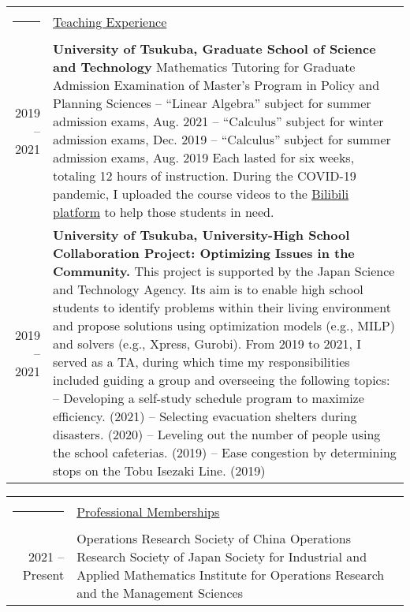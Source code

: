 \documentclass[a4paper,11pt]{article}
\newcommand{\headingfont}{\LARGE \MakeUppercase }
\newenvironment{SectionTable}[1]{
	\renewcommand*{\arraystretch}{1.0}
	\setlength{\tabcolsep}{10pt}
	\begin{longtable}{Rp{5.2in}} 
		\rule{2.3cm}{4pt} 
		& \underline{#1} \\ %
	}
	{
	\end{longtable}\vspace{-.3cm}
}
\begin{document}
\begin{SectionTable}{\headingfont Teaching Experience}
	2019 -- 2021 &
	\textbf{University of Tsukuba, Graduate School of Science and Technology} \newline
	Mathematics Tutoring for Graduate Admission Examination of Master's Program in Policy and Planning Sciences \newline
	-- ``Linear Algebra'' subject for summer admission exams, Aug. 2021  \newline
	-- ``Calculus'' subject for winter admission exams, Dec. 2019 \newline
	-- ``Calculus'' subject for summer admission exams, Aug. 2019 \newline
	Each lasted for six weeks, totaling 12 hours of instruction. During the COVID-19 pandemic, I uploaded the course videos to the \href{https://space.bilibili.com/16115578}{Bilibili platform} to help those students in need. \\
	 
	 2019 -- 2021 &
	 \textbf{University of Tsukuba, University-High School Collaboration Project: Optimizing Issues in the Community.} \newline	
	This project is supported by the Japan Science and Technology Agency. Its aim is to enable high school students to identify problems within their living environment and propose solutions using optimization models (e.g., MILP) and solvers (e.g., Xpress, Gurobi). \newline	
	From 2019 to 2021, I served as a TA, during which time my responsibilities included guiding a group and overseeing the following topics: \newline
	--  {Developing a self-study schedule program to maximize efficiency}. (2021) \newline
	--  {Selecting evacuation shelters during disasters}. (2020) \newline 
	--  {Leveling out the number of people using the school cafeterias}. (2019) \newline
	--  {Ease congestion by determining stops on the Tobu Isezaki Line}. (2019) 
\end{SectionTable}


\begin{SectionTable}{\headingfont Professional Memberships}
2021 -- Present & 
Operations Research Society of China \newline
Operations Research Society of Japan \newline
Society for Industrial and Applied Mathematics \newline
Institute for Operations Research and the Management Sciences \\
\end{SectionTable}
\end{document}

